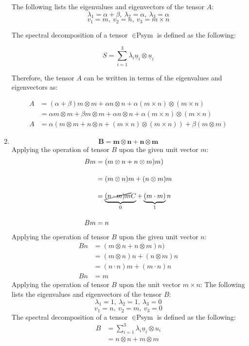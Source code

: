 \begin{enumerate}
The following lists the eigenvalues and eigenvectors of the tensor $A$:
$$
\lambda_{1}=\alpha+\beta,\ \lambda_{2}=\alpha,\ \lambda_{3}=\alpha
$$
$$
v_{1}=m,\ v_{2}=n, \ v_{3}=m\times n
$$

The spectral decomposition of a tensor $\in \text{Psym}$ is defined as the following:

$$
S=\sum_{i=1}^3 \lambda_{i}\underline{u}_{i}\otimes \underline{u}_{i}
$$

Therefore, the tensor $A$ can be written in terms of the eigenvalues and eigenvectors as:

\begin{align*}
A&=(\alpha+\beta)m\otimes m+\alpha n\otimes n+\alpha(m\times n)\otimes (m\times n)\\[10pt]
&=\alpha m\otimes m+\beta m\otimes m+\alpha n\otimes n+\alpha(m\times n)\otimes (m\times n)\\[10pt]
A&=\alpha(m\otimes m+n\otimes n+(m\times n)\otimes (m\times n))+\beta(m\otimes m)
\end{align*}

    \item $$
    \mathbf{B}=\mathbf{m}\otimes \mathbf{n}+\mathbf{n}\otimes \mathbf{m}
    $$
    Applying the operation of tensor $B$ upon the given unit vector $m$:
    \begin{align*}
        Bm &=(m\otimes n+n\otimes m)m)\\[10pt]
        &=(m\otimes n)m+(n\otimes m)m\\[10pt]
        &=\underbrace{ \cancel{ (n\cdot m)m }C }_{ 0 }+\underbrace{ (m\cdot m) }_{ 1 }n\\[10pt]
        Bm&=n
        \end{align*}
        Applying the operation of tensor $B$ upon the given unit vector $n$:
        \begin{align*}
            Bn&=(m\otimes n+n\otimes m)n)\\[10pt]
            &=(m\otimes n)n+(n\otimes m)n\\[10pt]
            &=(n\cdot n)m+(m\cdot n)n\\[10pt]
            Bn&=m
            \end{align*}
            Applying the operation of tensor $B$ upon the unit vector $m\times n$:
            The following lists the eigenvalues and eigenvectors of the tensor $B$:
$$
\lambda_{1}=1,\ \lambda_{2}=1,\ \lambda_{3}=0
$$
$$
v_{1}=n, \ v_{2}=m,\ v_{3}=0
$$
The spectral decomposition of a tensor $\in \text{Psym}$ is defined as the following:
\begin{align*}
B&=\sum_{i=1}^3 \lambda_{i}\underline{u}_{i}\otimes u_{i}\\[10pt]
&=n\otimes n+m\otimes m\\[10pt]
\end{align*}
\end{enumerate}